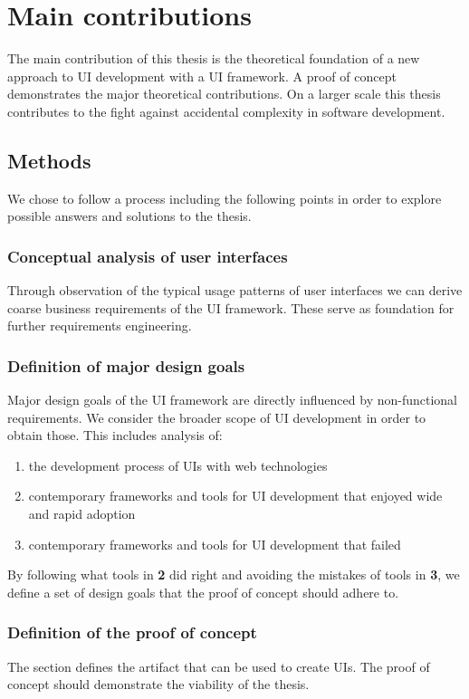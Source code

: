 \section{Main contributions}\label{contributions}
The main contribution of this thesis is the theoretical foundation of a new approach to UI development with a UI framework. A proof of concept demonstrates the major theoretical contributions. On a larger scale this thesis contributes to the fight against accidental complexity in software development.

\subsection{Methods}\label{usecases}
We chose to follow a process including the following points in order to explore possible answers and solutions to the thesis.

\subsubsection{Conceptual analysis of user interfaces}
Through observation of the typical usage patterns of user interfaces we can derive coarse business requirements of the UI framework. These serve as foundation for further requirements engineering.

\subsubsection{Definition of major design goals}
Major design goals of the UI framework are directly influenced by non-functional requirements. We consider the broader scope of UI development in order to obtain those. This includes analysis of:

\begin{enumerate}
  \item the development process of UIs with web technologies
  \item contemporary frameworks and tools for UI development that enjoyed wide and rapid adoption
  \item contemporary frameworks and tools for UI development that failed
\end{enumerate}

By following what tools in \textbf{2} did right and avoiding the mistakes of tools in \textbf{3}, we define a set of design goals that the proof of concept should adhere to.

\subsubsection{Definition of the proof of concept}
The section defines the artifact that can be used to create UIs. The proof of concept should demonstrate the viability of the thesis.


